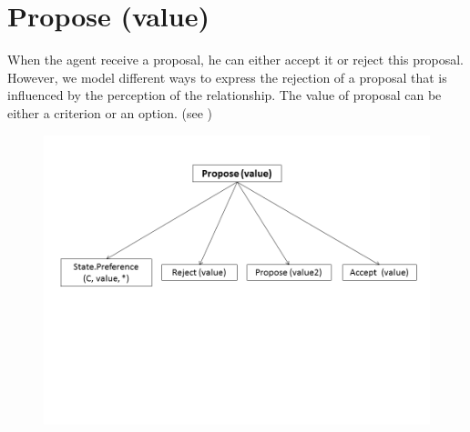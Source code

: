 \documentclass{llncs}
\begin{document}
\section{Propose (value)}
	\par When the agent receive a proposal, he can either accept it or reject this proposal. However, we model different ways to express the rejection of a proposal that is influenced by the perception of the relationship. The value of proposal can be either a criterion or an option. (see )
	\begin{figure}[h]
		\centerline{\includegraphics[width=5in]{utterances/Diapositive3.PNG}}
		\vskip 8pt
	\end{figure}
\end{document}

